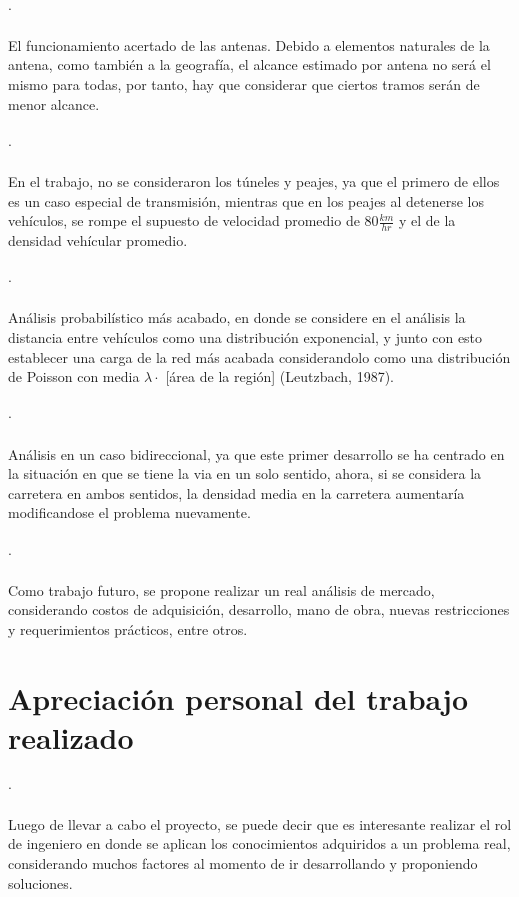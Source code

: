 \documentclass[12pt]{article}
\begin{document}
\paragraph{$\cdot$}El funcionamiento acertado de las antenas. Debido a elementos naturales de la antena, 
como también a la geografía, el alcance estimado por antena no será el mismo para todas, por tanto, hay 
que considerar que ciertos tramos serán de menor alcance.
\paragraph{$\cdot$}En el trabajo, no se consideraron los túneles y peajes, ya que el primero de ellos es 
un caso especial de transmisión, mientras que en los peajes al detenerse los vehículos, se rompe el 
supuesto de velocidad promedio de $80 \frac{km}{hr}$ y el de la densidad vehícular promedio.
\paragraph{$\cdot$}Análisis probabilístico más acabado, en donde se considere en el análisis la distancia 
entre vehículos como una distribución exponencial, y junto con esto establecer una carga de la red más 
acabada considerandolo como una distribución de Poisson con media $\lambda \cdot$ [área de la región] 
(Leutzbach, 1987).
\paragraph{$\cdot$}Análisis en un caso bidireccional, ya que este primer desarrollo se ha centrado en 
la situación en que se tiene la via en un solo sentido, ahora, si se considera la carretera en ambos
sentidos, la densidad media en la carretera aumentaría modificandose el problema nuevamente.
\paragraph{$\cdot$}Como trabajo futuro, se propone realizar un real análisis de mercado, considerando
costos de adquisición, desarrollo, mano de obra, nuevas restricciones y requerimientos prácticos, entre 
otros.


\newpage
\section{Apreciación personal del trabajo realizado}
\paragraph{$\cdot$}
Luego de llevar a cabo el proyecto, se puede decir que es interesante realizar el rol de ingeniero en 
donde se aplican los conocimientos adquiridos a un problema real, considerando muchos factores al 
momento de ir desarrollando y proponiendo soluciones.
\end{document}
